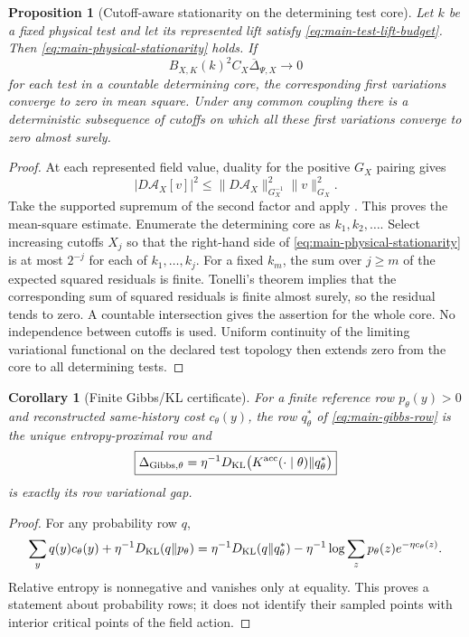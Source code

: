 \documentclass[11pt]{article}
\newtheorem{proposition}[proposition]{Proposition}
\newtheorem{corollary}[corollary]{Corollary}
\theoremstyle{definition}
\theoremstyle{remark}
\begin{document}
\begin{proposition}[Cutoff-aware stationarity on the determining test core]
\label{prop:supp-physical-test-stationarity}
Let $k$ be a fixed physical test and let its represented lift satisfy
\eqref{eq:main-test-lift-budget}.  Then
\eqref{eq:main-physical-stationarity} holds.  If
\begin{equation}
 B_{X,K}(k)^2C_X\overline\Delta_{\Psi,X}\longrightarrow0
 \label{eq:supp-scaled-test-gap}
\end{equation}
for each test in a countable determining core, the corresponding first
variations converge to zero in mean square.  Under any common coupling there
is a deterministic subsequence of cutoffs on which all these first variations
converge to zero almost surely.
\end{proposition}
\begin{proof}
At each represented field value, duality for the positive $G_X$ pairing gives
\[
 |D\mathcal A_X[v]|^2
 \le\|D\mathcal A_X\|_{G_X^{-1}}^2\|v\|_{G_X}^2.
\]
Take the supported supremum of the second factor and apply
.  This proves the mean-square estimate.
Enumerate the determining core as $k_1,k_2,\ldots$.  Select increasing cutoffs
$X_j$ so that the right-hand side of
\eqref{eq:main-physical-stationarity} is at most $2^{-j}$ for each of
$k_1,\ldots,k_j$.  For a fixed $k_m$, the sum over $j\ge m$ of the expected
squared residuals is finite.  Tonelli's theorem implies that the corresponding
sum of squared residuals is finite almost surely, so the residual tends to
zero.  A countable intersection gives the assertion for the whole core.
No independence between cutoffs is used.  Uniform continuity of the limiting
variational functional on the declared test topology then extends zero from
the core to all determining tests.
\end{proof}

\begin{corollary}[Finite Gibbs/KL certificate]
\label{cor:supp-gibbs-gap}
For a finite reference row $p_\theta(y)>0$ and reconstructed same-history cost
$c_\theta(y)$, the row $q_\theta^*$ of \eqref{eq:main-gibbs-row} is the unique
entropy-proximal row and
\begin{equation}
 \boxed{\Delta_{{\rm Gibbs},\theta}
       =\eta^{-1}D_{\rm KL}
       \bigl(K^{\rm acc}(\cdot\mid\theta)\Vert q_\theta^*\bigr)}
 \label{eq:supp-gibbs-gap}
\end{equation}
is exactly its row variational gap.
\end{corollary}
\begin{proof}
For any probability row $q$,
\[
 \sum_yq(y)c_\theta(y)+\eta^{-1}D_{\rm KL}(q\Vert p_\theta)
 =\eta^{-1}D_{\rm KL}(q\Vert q_\theta^*)
       -\eta^{-1}\log\sum_zp_\theta(z)e^{-\eta c_\theta(z)}.
\]
Relative entropy is nonnegative and vanishes only at equality.  This proves a
statement about probability rows; it does not identify their sampled points
with interior critical points of the field action.
\end{proof}
\end{document}
